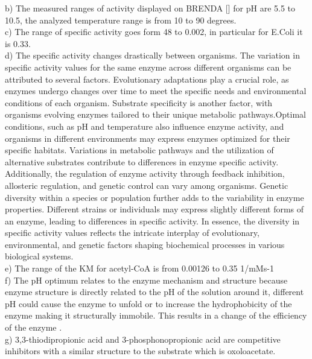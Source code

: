 \documentclass[a4paper,english,12pt,bibliography=totoc]{scrreprt}
\begin{document}
b) The measured ranges of activity displayed on BRENDA [\cite{chang_brenda_2021}] for pH are 5.5 to 10.5, the  analyzed temperature range is from 10 to 90 degrees.\\

c) The range of specific activity goes form 48 to 0.002, in particular for E.Coli it is 0.33.\\

d) The specific activity changes drastically between organisms. The variation in specific activity values for the same enzyme across different organisms can be attributed to several factors. Evolutionary adaptations play a crucial role, as enzymes undergo changes over time to meet the specific needs and environmental conditions of each organism. Substrate specificity is another factor, with organisms evolving enzymes tailored to their unique metabolic pathways.Optimal conditions, such as pH and temperature also influence enzyme activity, and organisms in different environments may express enzymes optimized for their specific habitats. Variations in metabolic pathways and the utilization of alternative substrates contribute to differences in enzyme specific activity. Additionally, the regulation of enzyme activity through feedback inhibition, allosteric regulation, and genetic control can vary among organisms. Genetic diversity within a species or population further adds to the variability in enzyme properties. Different strains or individuals may express slightly different forms of an enzyme, leading to differences in specific activity. In essence, the diversity in specific activity values reflects the intricate interplay of evolutionary, environmental, and genetic factors shaping biochemical processes in various biological systems.\\

e) The range of the KM for acetyl-CoA is from 0.00126 to 0.35 1/mMs-1\\

f) The pH optimum  relates to the enzyme mechanism and structure because enzyme structure is directly related to the pH of the solution around it, different pH could cause the enzyme to unfold or to increase the hydrophobicity of the enzyme making it structurally immobile. This results in a change of the efficiency of the enzyme .\\

g)  3,3-thiodipropionic acid and 3-phosphonopropionic acid are competitive inhibitors with a similar structure to the substrate which is oxoloacetate.\\
\end{document}
